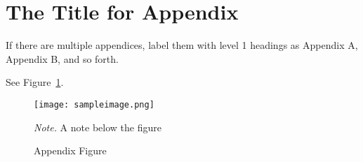 \documentclass[
  man,
  longtable,
  nolmodern,
  notxfonts,
  notimes,
  colorlinks=true,linkcolor=blue,citecolor=blue,urlcolor=blue]{apa7}
\newlength{\cslhangindent}
\newenvironment{CSLReferences}[2] %
 {\begin{list}{}{%
  \setlength{\itemindent}{0pt}
  \setlength{\leftmargin}{0pt}
  \setlength{\parsep}{0pt}
  \ifodd #1
   \setlength{\leftmargin}{\cslhangindent}
   \setlength{\itemindent}{-1\cslhangindent}
  \fi
  \setlength{\itemsep}{#2\baselineskip}}}
 {\end{list}}
\begin{document}
\label{refs}
\begin{CSLReferences}{0}{1}
\end{CSLReferences}

\appendix

\section{The Title for Appendix}\label{the-title-for-appendix}

If there are multiple appendices, label them with level 1 headings as
Appendix A, Appendix B, and so forth.

See Figure~\ref{fig-appendfig}.

\begin{figure}

{\caption{{Appendix Figure}{\label{fig-appendfig}}}}

\texttt{[image: sampleimage.png]}

{\noindent \emph{Note.} A note below the figure}

\end{figure}
\end{document}
